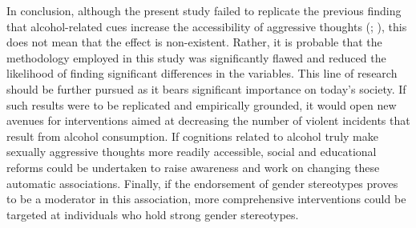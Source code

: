 \documentclass[serif, authorddate, twocolumn, empirical]{jote-article}
\begin{document}
In conclusion, although the present study failed to replicate the previous finding that alcohol-related cues increase the accessibility of aggressive thoughts (\cite{BartholowHeinz2006}; \cite{SubraMullerBegueLBushmanDelmas2010}), this does not mean that the effect is non-existent. Rather, it is probable that the methodology employed in this study was significantly flawed and reduced the likelihood of finding significant differences in the variables. This line of research should be further pursued as it bears significant importance on today’s society. If such results were to be replicated and empirically grounded, it would open new avenues for interventions aimed at decreasing the number of violent incidents that result from alcohol consumption. If cognitions related to alcohol truly make sexually aggressive thoughts more readily accessible, social and educational reforms could be undertaken to raise awareness and work on changing these automatic associations. Finally, if the endorsement of gender stereotypes proves to be a moderator in this association, more comprehensive interventions could be targeted at individuals who hold strong gender stereotypes.

\setlength{\bibhang}{\parindent}
\nocite{*} 
{}
\printbibliography




\end{document}
